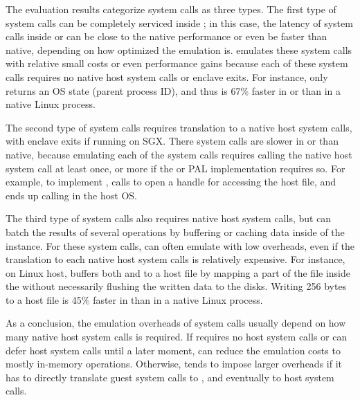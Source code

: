 The evaluation results categorize
system calls as three types.
The first type of system calls can be completely serviced inside \thelibos{};
in this case, the latency of system calls
inside \graphene{} or \graphenesgx{}
can be close to the native performance
or even be faster than native,
depending on how optimized the emulation is.
\graphene{} emulates
these system calls with relative small costs or even performance gains
because each of these system calls requires
no native host system calls
or enclave exits.
For instance,
 only returns an OS state
(parent process ID),
and thus is 67\% faster
in \graphene{} or \graphenesgx{}
than in a native Linux process.


The second type of system calls requires translation to a native host system calls,
with enclave exits if running on SGX.
There system calls are slower in \graphene{} or \graphenesgx{} than native,
because emulating each of the system calls
requires calling the native host system call at least once,
or more if the \thelibos{} or PAL implementation
requires so.
For example, to implement , \thelibos{} calls  to open a handle
for accessing the host file,
and ends up calling  in the host OS.


The third type of system calls also requires native host system calls, but \thelibos{} can batch
the results of several operations by buffering
or caching data inside of the \libos{} instance.
For these system calls,
\thelibos{} can often emulate with low overheads,
even if the translation to each native host system calls is relatively expensive.
For instance, on Linux host, \thelibos{} buffers both  and  to a host file
by mapping a part of the file inside the \picoproc{}
without necessarily flushing the written data to the disks.
Writing 256 bytes
to a host file is \roughly{}45\% faster in \graphene{} than in a native Linux process.  


As a conclusion,
the emulation overheads of system calls usually depend on how many native host system calls
is required.
If \thelibos{} requires no host system calls
or can defer host system calls
until a later moment, \thelibos{} can reduce the emulation costs to mostly in-memory operations.
Otherwise,
\thelibos{} tends to impose larger overheads
if it has to directly translate guest system calls to \hostapis{}, and eventually to host system calls.





